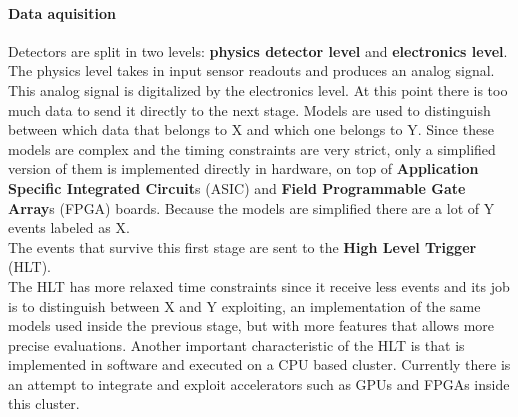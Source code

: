 \paragraph{Data aquisition}
Detectors are split in two levels: \textbf{physics detector level} and \textbf{electronics level}. The physics level takes in input sensor readouts and produces an analog signal. This analog signal is digitalized by the electronics level. At this point there is too much data to send it directly to the next stage. Models are used to distinguish between which data that belongs to X and which one belongs to Y. Since these models are complex and the timing constraints are very strict, only a simplified version of them is implemented directly in hardware, on top of \textbf{Application Specific Integrated Circuit}s (ASIC) and \textbf{Field Programmable Gate Array}s (FPGA) boards. Because the models are simplified there are a lot of Y events labeled as X. \\
The events that survive this first stage are sent to the \textbf{High Level Trigger} (HLT).\\
The HLT has more relaxed time constraints since it receive less events and its job is to distinguish between X and Y exploiting, an implementation of the same models used inside the previous stage, but with more features that allows more precise evaluations. Another important characteristic of the HLT is that is implemented in software and executed on a CPU based cluster. Currently there is an attempt to integrate and exploit accelerators such as GPUs and FPGAs inside this cluster.
